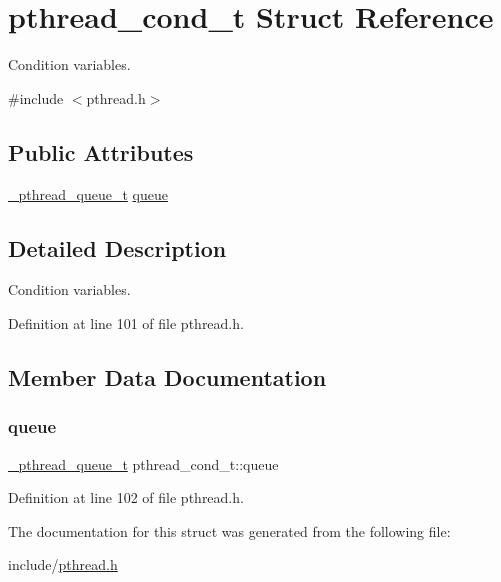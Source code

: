 \hypertarget{structpthread__cond__t}{}\section{pthread\+\_\+cond\+\_\+t Struct Reference}
\label{structpthread__cond__t}


Condition variables.  




{\ttfamily \#include $<$pthread.\+h$>$}

\subsection*{Public Attributes}
\begin{DoxyCompactItemize}
\item 
\mbox{\hyperlink{pthread_8h_a547e924a1dbc72063242456b6390011e}{\+\_\+pthread\+\_\+queue\+\_\+t}} \mbox{\hyperlink{structpthread__cond__t_a8cc1423937da60778b24e8c5a82173bd}{queue}}
\end{DoxyCompactItemize}


\subsection{Detailed Description}
Condition variables. 

Definition at line 101 of file pthread.\+h.



\subsection{Member Data Documentation}
\mbox{\label{structpthread__cond__t_a8cc1423937da60778b24e8c5a82173bd}} 
\subsubsection{\texorpdfstring{queue}{queue}}
{\footnotesize\ttfamily \mbox{\hyperlink{pthread_8h_a547e924a1dbc72063242456b6390011e}{\+\_\+pthread\+\_\+queue\+\_\+t}} pthread\+\_\+cond\+\_\+t\+::queue}



Definition at line 102 of file pthread.\+h.



The documentation for this struct was generated from the following file\+:\begin{DoxyCompactItemize}
\item 
include/\mbox{\hyperlink{pthread_8h}{pthread.\+h}}\end{DoxyCompactItemize}

